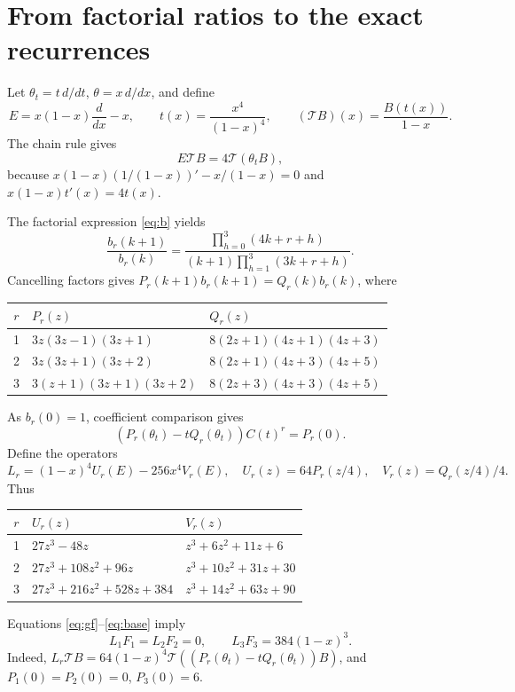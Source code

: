 \documentclass[11pt]{article}
\begin{document}
\section{From factorial ratios to the exact recurrences}
Let $\theta_t=t\,d/dt$, $\theta=x\,d/dx$, and define
\[
 E=x(1-x)\frac d{dx}-x,\qquad
 t(x)=\frac{x^4}{(1-x)^4},\qquad
 (\mathcal T B)(x)=\frac{B(t(x))}{1-x}.
\]
The chain rule gives
\begin{equation}\label{eq:conjugacy}
 E\mathcal T B=4\mathcal T(\theta_t B),
\end{equation}
because $x(1-x)(1/(1-x))'-x/(1-x)=0$ and
$x(1-x)t'(x)=4t(x)$.

The factorial expression \eqref{eq:b} yields
\[
 \frac{b_r(k+1)}{b_r(k)}=
 \frac{\prod_{h=0}^{3}(4k+r+h)}{(k+1)\prod_{h=1}^{3}(3k+r+h)}.
\]
Cancelling factors gives $P_r(k+1)b_r(k+1)=Q_r(k)b_r(k)$, where
\begin{center}\small
\begin{tabular}{c ll}
\toprule
$r$&$P_r(z)$&$Q_r(z)$\\\midrule
1&$3z(3z-1)(3z+1)$&$8(2z+1)(4z+1)(4z+3)$\\
2&$3z(3z+1)(3z+2)$&$8(2z+1)(4z+3)(4z+5)$\\
3&$3(z+1)(3z+1)(3z+2)$&$8(2z+3)(4z+3)(4z+5)$\\
\bottomrule
\end{tabular}
\end{center}
As $b_r(0)=1$, coefficient comparison gives
\begin{equation}\label{eq:base}
 (P_r(\theta_t)-tQ_r(\theta_t))C(t)^r=P_r(0).
\end{equation}
Define the operators
\[
 L_r=(1-x)^4U_r(E)-256x^4V_r(E),
 \quad U_r(z)=64P_r(z/4),\quad V_r(z)=Q_r(z/4)/4.
\]
Thus
\begin{center}\small
\begin{tabular}{c ll}
\toprule
$r$&$U_r(z)$&$V_r(z)$\\\midrule
1&$27z^3-48z$&$z^3+6z^2+11z+6$\\
2&$27z^3+108z^2+96z$&$z^3+10z^2+31z+30$\\
3&$27z^3+216z^2+528z+384$&$z^3+14z^2+63z+90$\\
\bottomrule
\end{tabular}
\end{center}
Equations \eqref{eq:gf}--\eqref{eq:base} imply
\begin{equation}\label{eq:forcing}
 L_1F_1=L_2F_2=0,\qquad L_3F_3=384(1-x)^3.
\end{equation}
Indeed, $L_r\mathcal T B=64(1-x)^4\mathcal T
((P_r(\theta_t)-tQ_r(\theta_t))B)$, and
$P_1(0)=P_2(0)=0$, $P_3(0)=6$.
\end{document}
